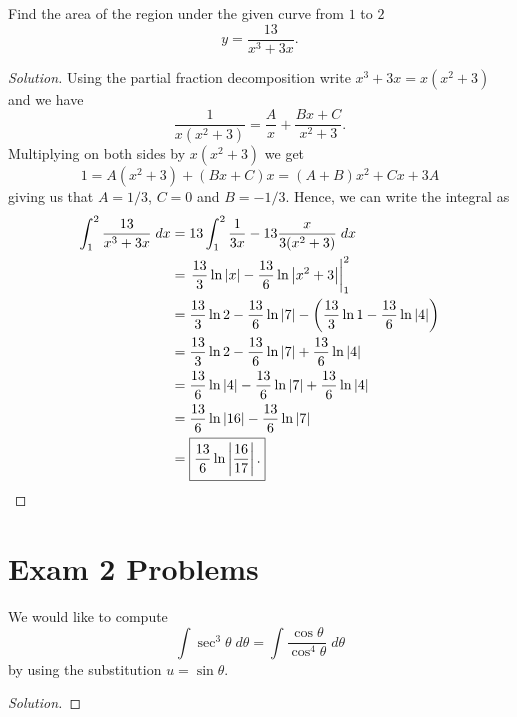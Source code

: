 \begin{problem}[WebAssign, HW 14, \# 5]
Find the area of the region under the given curve from $1$ to $2$
\[
y=\frac{13}{x^3+3x}.
\]
\end{problem}
\begin{proof}[Solution]
Using the partial fraction decomposition write $x^3+3x=x(x^2+3)$ and we
have
\[
\frac{1}{x(x^2+3)}=\frac{A}{x}+\frac{Bx+C}{x^2+3}.
\]
Multiplying on both sides by $x(x^2+3)$ we get
\[
1=A(x^2+3)+(Bx+C)x=(A+B)x^2+Cx+3A
\]
giving us that $A=1/3$, $C=0$ and $B=-1/3$. Hence, we can write the
integral as
\begin{align*}
\int_1^2\frac{13}{x^3+3x}\;dx
&=13\int_1^2\frac{1}{3x}-13\frac{x}{3(x^2+3)}\;dx\\
&=\left.\frac{13}{3}\ln|x|-\frac{13}{6}\ln\left|x^2+3\right|\right|_1^2\\
&=\frac{13}{3}\ln 2-\frac{13}{6}\ln|7|
-\left(\frac{13}{3}\ln 1-\frac{13}{6}\ln|4|\right)\\
&=\frac{13}{3}\ln 2-\frac{13}{6}\ln|7|+\frac{13}{6}\ln|4|\\
&=\frac{13}{6}\ln|4|-\frac{13}{6}\ln|7|+\frac{13}{6}\ln|4|\\
&=\frac{13}{6}\ln|16|-\frac{13}{6}\ln|7|\\
&=\boxed{\frac{13}{6}\ln\left|\frac{16}{17}\right|.}\qedhere
\end{align*}
\end{proof}

\section{Exam 2 Problems}
\begin{problem}[Spring 2015, \# 5]
We would like to compute
\[
\int\sec^3\theta\;d\theta=\int\frac{\cos\theta}{\cos^4\theta}\;d\theta
\]
by using the substitution $u=\sin\theta$.
\end{problem}
\begin{proof}[Solution]
\end{proof}

